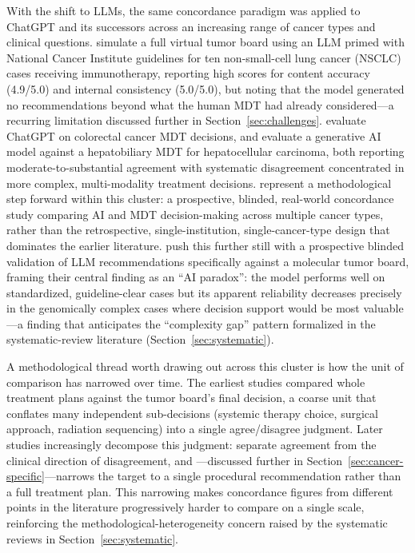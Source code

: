 \documentclass{article}
\begin{document}
With the shift to LLMs, the same concordance paradigm was applied to ChatGPT and its successors across an increasing range of cancer types and clinical questions. \citet{ismayilov2025} simulate a full virtual tumor board using an LLM primed with National Cancer Institute guidelines for ten non-small-cell lung cancer (NSCLC) cases receiving immunotherapy, reporting high scores for content accuracy (4.9/5.0) and internal consistency (5.0/5.0), but noting that the model generated no recommendations beyond what the human MDT had already considered---a recurring limitation discussed further in Section~\ref{sec:challenges}. \citet{chatziisaak2025} evaluate ChatGPT on colorectal cancer MDT decisions, and \citet{ciulli2026} evaluate a generative AI model against a hepatobiliary MDT for hepatocellular carcinoma, both reporting moderate-to-substantial agreement with systematic disagreement concentrated in more complex, multi-modality treatment decisions. \citet{pinninti2026} represent a methodological step forward within this cluster: a prospective, blinded, real-world concordance study comparing AI and MDT decision-making across multiple cancer types, rather than the retrospective, single-institution, single-cancer-type design that dominates the earlier literature. \citet{seshachalam2026} push this further still with a prospective blinded validation of LLM recommendations specifically against a molecular tumor board, framing their central finding as an ``AI paradox'': the model performs well on standardized, guideline-clear cases but its apparent reliability decreases precisely in the genomically complex cases where decision support would be most valuable---a finding that anticipates the ``complexity gap'' pattern formalized in the systematic-review literature (Section~\ref{sec:systematic}).

A methodological thread worth drawing out across this cluster is how the unit of comparison has narrowed over time. The earliest studies \cite{somashekhar2018} compared whole treatment plans against the tumor board's final decision, a coarse unit that conflates many independent sub-decisions (systemic therapy choice, surgical approach, radiation sequencing) into a single agree/disagree judgment. Later studies increasingly decompose this judgment: \citet{aliyev2026} separate agreement from the clinical direction of disagreement, and \citet{aubreville2024}---discussed further in Section~\ref{sec:cancer-specific}---narrows the target to a single procedural recommendation rather than a full treatment plan. This narrowing makes concordance figures from different points in the literature progressively harder to compare on a single scale, reinforcing the methodological-heterogeneity concern raised by the systematic reviews in Section~\ref{sec:systematic}.
\end{document}
